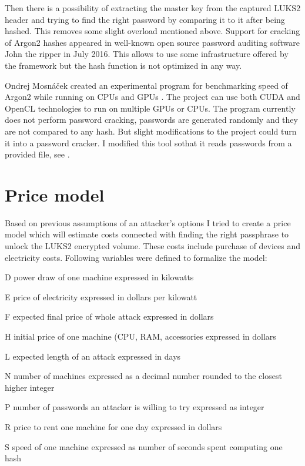 \documentclass[nolof]{fithesis3}
\begin{document}
Then there is a possibility of extracting the master key from the captured LUKS2 header and trying to find the right password by comparing it to it after being hashed. This removes some slight overload mentioned above. Support for cracking of Argon2 hashes appeared in well-known open source password auditing software John the ripper in July 2016. This allows to use some infrastructure offered by the framework but the hash function is not optimized in any way.

Ondrej Mosnáček created an experimental program for benchmarking speed of Argon2 while running on CPUs and GPUs \parencite{argon2gpu}. The project can use both CUDA and OpenCL technologies to run on multiple GPUs or CPUs. The program currently does not perform password cracking, passwords are generated randomly and they are not compared to any hash. But slight modifications to the project could turn it into a password cracker. I modified this tool sothat it reads passwords from a provided file, see \parencite{argon2gpuvojta}.

\section{Price model}
\label{sec:model}
Based on previous assumptions of an attacker's options I tried to create a price model which will estimate costs connected with finding the right passphrase to unlock the LUKS2 encrypted volume. These costs include purchase of devices and electricity costs. Following variables were defined to formalize the model:

\begin{description}
\item{D} power draw of one machine expressed in kilowatts

\item{E} price of electricity expressed in dollars per kilowatt

\item{F} expected final price of whole attack expressed in dollars

\item{H} initial price of one machine (CPU, RAM, accessories expressed in dollars

\item{L} expected length of an attack expressed in days

\item{N} number of machines expressed as a decimal number rounded to the closest higher integer

\item{P} number of passwords an attacker is willing to try expressed as integer

\item{R} price to rent one machine for one day expressed in dollars

\item{S} speed of one machine expressed as number of seconds spent computing one hash
\end{description}
\end{document}
